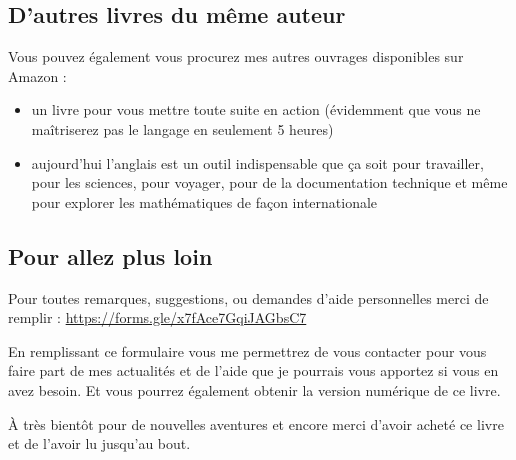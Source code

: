\subsection{D'autres livres du même auteur}

Vous pouvez également vous procurez mes autres ouvrages disponibles sur Amazon : 

\begin{itemize}
	\item {} un livre pour vous mettre toute suite en action (évidemment que vous ne maîtriserez pas le langage en seulement 5 heures)
	\item {} aujourd'hui l'anglais est un outil indispensable que ça soit pour travailler, pour les sciences, pour voyager, pour de la documentation technique et même pour explorer les mathématiques de façon internationale
\end{itemize}


\subsection{Pour allez plus loin}


Pour toutes remarques, suggestions, ou demandes d'aide personnelles merci de remplir  : \url{https://forms.gle/x7fAce7GqiJAGbsC7}

En remplissant ce formulaire vous me permettrez de vous contacter pour vous faire part de mes actualités et de l'aide que je pourrais vous apportez si vous en avez besoin. Et vous pourrez également obtenir la version numérique de ce livre.


À très bientôt pour de nouvelles aventures et encore merci d'avoir acheté ce livre et de l'avoir lu jusqu'au bout.

\newpage
